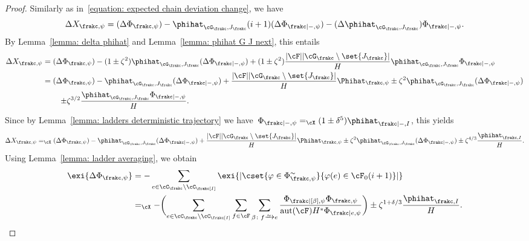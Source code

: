 \documentclass[11pt]{amsart}
\DeclarePairedDelimiter{\paren}{\lparen}{\rparen}
\DeclarePairedDelimiter{\abs}{\lvert}{\rvert}
\newcommand{\Xeq}{=_{\cX}}
\def\phi{\varphi}
\newcommand{\bijection}{\mathchoice
	{\xrightarrow{\smash{\raisebox{-3pt}{$\scriptstyle\sim$}}}}%
	{\xrightarrow{\smash{\raisebox{-3pt}{$\scriptstyle\sim$}}}}%
	{\xrightarrow{\smash{\raisebox{-2.5pt}{$\scriptscriptstyle\sim$}}}}%
	{\xrightarrow{\smash{\raisebox{-2.5pt}{$\scriptscriptstyle\sim$}}}}%
}
\DeclareMathOperator{\aut}{aut}
\newcommand{\om}{\mathord{-}}
\theoremstyle{definition}
\numberwithin{equation}{section}
\begin{document}
	\begin{proof}
		Similarly as in~\eqref{equation: expected chain deviation change}, we have
		\begin{equation*}
			\Delta X_{\frakc,\psi}=(\Delta\Phi_{\frakc,\psi})-\phihat_{\cG_\frakc,J_\frakc}(i+1)(\Delta\Phi_{\frakc|\om,\psi})-(\Delta\phihat_{\cG_\frakc,J_\frakc})\Phi_{\frakc|\om,\psi}.
		\end{equation*}
		By Lemma~\ref{lemma: delta phihat} and Lemma~\ref{lemma: phihat G J next}, this entails
		\begin{equation*}
			\begin{aligned}
				\Delta X_{\frakc,\psi}
				&=(\Delta\Phi_{\frakc,\psi})-(1\pm\zeta^{2})\phihat_{\cG_\frakc,J_\frakc}(\Delta\Phi_{\frakc|\om,\psi})+(1\pm\zeta^{2})\frac{\abs{\cF}\abs{\cG_\frakc\setminus\set{J_\frakc}}}{H}\phihat_{\cG_\frakc,J_\frakc}\Phi_{\frakc|\om,\psi}\\
				&=(\Delta\Phi_{\frakc,\psi})-\phihat_{\cG_\frakc,J_\frakc}(\Delta\Phi_{\frakc|\om,\psi})+\frac{\abs{\cF}\abs{\cG_\frakc\setminus\set{J_\frakc}}}{H}\Phihat_{\frakc,\psi}\pm\zeta^{2}\phihat_{\cG_\frakc,J_\frakc}(\Delta\Phi_{\frakc|\om,\psi})\\&\hphantom{=}\mathrel{}\quad\pm \zeta^{3/2}\frac{\phihat_{\cG_\frakc,J_\frakc}\Phi_{\frakc|\om,\psi}}{H}.
			\end{aligned}
		\end{equation*}
		Since by Lemma~\ref{lemma: ladders deterministic trajectory} we have~$\Phi_{\frakc|\om,\psi}\Xeq (1\pm \delta^5)\phihat_{\frakc|\om,I}$, this yields
		\begin{equation}\label{equation: base expression for X}
			\Delta X_{\frakc,\psi}
			\Xeq(\Delta\Phi_{\frakc,\psi})-\phihat_{\cG_\frakc,J_\frakc}(\Delta\Phi_{\frakc|\om,\psi})+\frac{\abs{\cF}\abs{\cG_\frakc\setminus\set{J_\frakc}}}{H}\Phihat_{\frakc,\psi}\pm\zeta^{2}\phihat_{\cG_\frakc,J_\frakc}(\Delta\Phi_{\frakc|\om,\psi})\pm \zeta^{4/3}\frac{\phihat_{\frakc,I}}{H}.
		\end{equation}
		Using Lemma~\ref{lemma: ladder averaging}, we obtain
		\begin{equation}\label{equation: expected c change}
			\begin{aligned}
				\exi{\Delta\Phi_{\frakc,\psi}}
				&=-\sum_{e\in\cC_\frakc\setminus \cC_\frakc[I]} \exi{\abs{\cset{ \phi\in\Phi_{\frakc,\psi}^\sim }{ \phi(e)\in \cF_0(i+1) }}}\\
				&\Xeq-\paren[\bigg]{\sum_{e\in\cC_\frakc\setminus \cC_\frakc[I]}\sum_{f\in\cF}\sum_{\beta\colon f\bijection e}\frac{\Phi_{\frakc|[\beta],\psi}\Phi_{\frakc,\psi}}{\aut(\cF)H^*\Phi_{\frakc|e,\psi}}}\pm \zeta^{1+\delta/3}\frac{\phihat_{\frakc,I}}{H}.

\end{aligned}
\end{equation}
\end{proof}
\end{document}
